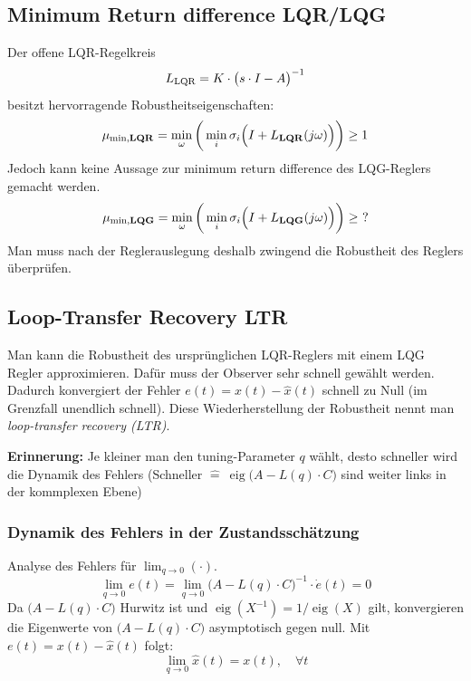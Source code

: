 \subsection{Minimum Return difference LQR/LQG}
Der offene LQR-Regelkreis 
\begin{equation*}
    L_{\textnormal{LQR}} = K\cdot \big(s\cdot I - A\big)^{-1}
\end{equation*}
besitzt hervorragende Robustheitseigenschaften:
\begin{equation*}
    \mu_{\textnormal{min,\textbf{LQR}}} = \min_\omega\bigg( \min_i\sigma_i\Big(I + L_{\textnormal{\textbf{LQR}}}(j\omega)\Big)\bigg) \geq 1
\end{equation*}
Jedoch kann keine Aussage zur minimum return difference des LQG-Reglers gemacht werden.
\begin{equation*}
    \mu_{\textnormal{min,\textbf{LQG}}} = \min_\omega\bigg( \min_i\sigma_i\Big(I + L_{\textnormal{\textbf{LQG}}}(j\omega)\Big)\bigg) \geq \ ?
\end{equation*}
Man muss nach der Reglerauslegung deshalb zwingend die Robustheit des Reglers überprüfen.

\subsection{Loop-Transfer Recovery LTR}
    Man kann die Robustheit des ursprünglichen LQR-Reglers mit einem LQG Regler approximieren. Dafür muss der Observer sehr schnell gewählt werden. Dadurch konvergiert der Fehler $e(t) = x(t)- \widehat{x}(t)$ schnell zu Null (im Grenzfall unendlich schnell). Diese Wiederherstellung der Robustheit nennt man \textit{loop-transfer recovery (LTR)}.
    
    \textbf{Erinnerung:} Je kleiner man den tuning-Parameter $q$ wählt, desto schneller wird die Dynamik des Fehlers (Schneller $\widehat{=} \ \operatorname{eig}\big(A - L(q)\cdot C\big)$ sind weiter links in der kommplexen Ebene)
    
    \subsubsection{Dynamik des Fehlers in der Zustandsschätzung}
        Analyse des Fehlers für $\displaystyle\lim_{q\to0}(\cdot)$.
        \begin{equation*}
            \lim_{q\to0}e(t) = \lim_{q\to0}\big(A - L(q)\cdot C\big)^{-1}\cdot\Dot{e}(t) = 0
        \end{equation*}
        Da $\big(A - L(q)\cdot C\big)$ Hurwitz ist und $\operatorname{eig}(X^{-1}) = 1/\operatorname{eig}(X)$ gilt,  konvergieren die Eigenwerte von $\big(A - L(q)\cdot C\big)$ asymptotisch gegen null. Mit $e(t) = x(t) - \widehat{x}(t)$ folgt:
        \begin{equation*}
            \lim_{q\to0} \widehat{x}(t) = x(t), \quad \forall t
        \end{equation*}
        
